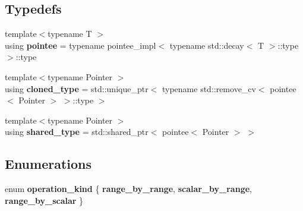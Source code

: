 \subsection*{Typedefs}
\begin{DoxyCompactItemize}
\item 
\mbox{\label{namespacegko_1_1detail_af19ef818a8715a16fe4a528246a1b64d}} 
{\footnotesize template$<$typename T $>$ }\\using {\bfseries pointee} = typename pointee\+\_\+impl$<$ typename std\+::decay$<$ T $>$\+::type $>$\+::type
\item 
\mbox{\label{namespacegko_1_1detail_af25bac9e635b0855144f37aae1c6a471}} 
{\footnotesize template$<$typename Pointer $>$ }\\using {\bfseries cloned\+\_\+type} = std\+::unique\+\_\+ptr$<$ typename std\+::remove\+\_\+cv$<$ pointee$<$ Pointer $>$ $>$\+::type $>$
\item 
\mbox{\label{namespacegko_1_1detail_aa722241e68400ba9bbf60a049a25ddfe}} 
{\footnotesize template$<$typename Pointer $>$ }\\using {\bfseries shared\+\_\+type} = std\+::shared\+\_\+ptr$<$ pointee$<$ Pointer $>$ $>$
\end{DoxyCompactItemize}
\subsection*{Enumerations}
\begin{DoxyCompactItemize}
\item 
\mbox{\label{namespacegko_1_1detail_add1e95566a113e325812962e2cd66efd}} 
enum {\bfseries operation\+\_\+kind} \{ {\bfseries range\+\_\+by\+\_\+range}, 
{\bfseries scalar\+\_\+by\+\_\+range}, 
{\bfseries range\+\_\+by\+\_\+scalar}
 \}
\end{DoxyCompactItemize}
